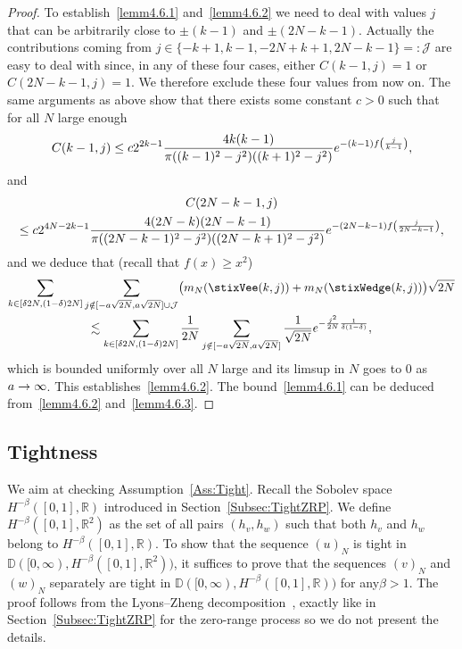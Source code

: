 \documentclass[AHL,Unicode,longabstracts]{cedram}
\newcommand{\Wedge}{\stixWedge}
\newcommand{\Vee}{\stixVee}
\theoremstyle{plain}
\newcommand{\bbD}{\mathbb{D}}
\newcommand{\cJ}{\mathcal{J}}
\newcommand{\R}{\mathbb{R}}
\let\originalleft\left
\let\originalright\right
\renewcommand{\left}{\mathopen{}\mathclose\bgroup\originalleft}
\renewcommand{\right}{\aftergroup\egroup\originalright}
\renewcommand*{\to}{\mathchoice{\longrightarrow}{\rightarrow}{\rightarrow}{\rightarrow}}
\begin{document}
\begin{proof}
To establish~\eqref{lemm4.6.1} and~\eqref{lemm4.6.2} we need to deal with values $j$ that can be arbitrarily close to $\pm (k-1)$ and $\pm (2N-k-1)$. Actually the contributions coming from $j\in \{-k+1,k-1,-2N+k+1,2N-k-1\}=:\cJ$ are easy to deal with since, in any of these four cases, either $C(k-1,j)=1$ or $C(2N-k-1,j)=1$. We therefore exclude these four values from now on. The same arguments as above show that there exists some constant $c>0$ such that for all $N$ large enough
\[
C(k-1,j) \le c 2^{2k-1} \frac{4k(k-1)}{\pi ((k-1)^2-j^2)((k+1)^2-j^2)} e^{-(k-1) f\left(\frac{j}{k-1}\right)},
\]
and
\begin{multline*}
C(2N-k-1,j) \\
\le c 2^{4N-2k-1} \frac{4(2N-k)(2N-k-1)}{\pi ((2N-k-1)^2-j^2)((2N-k+1)^2-j^2)} e^{-(2N-k-1) f\left(\frac{j}{2N-k-1}\right)},
\end{multline*}
and we deduce that (recall that $f(x) \ge x^2$)
\begin{multline*}
\sum_{k\in [\delta 2N, (1 - \delta) 2N]} \sum_{j\notin [-a\sqrt{2N}, a\sqrt{2N}]\cup \cJ}\bigl(m_N(\Vee(k,j)) + m_N(\Wedge(k,j))\bigr)\sqrt{2N}\\
\lesssim
\sum_{k\in [\delta 2N, (1 - \delta) 2N]} \frac1{2N}\sum_{j\notin [-a\sqrt{2N}, a\sqrt{2N}]}\frac1{\sqrt{2N}} e^{-\frac{j^2}{2N} \frac{1}{\delta(1-\delta)}},
\end{multline*}
which is bounded uniformly over all $N$ large and its limsup in $N$ goes to $0$ as $a\to\infty$. This establishes~\eqref{lemm4.6.2}. The bound~\eqref{lemm4.6.1} can be deduced from~\eqref{lemm4.6.2} and~\eqref{lemm4.6.3}.
\end{proof}

\subsection{Tightness}

We aim at checking Assumption~\ref{Ass:Tight}. Recall the Sobolev space $H^{-\beta}([0,1],\R)$ introduced in Section~\ref{Subsec:TightZRP}. We define $H^{-\beta}([0,1],\R^2)$ as the set of all pairs $(h_v,h_w)$ such that both $h_v$ and $h_w$ belong to $H^{-\beta}([0,1],\R)$. To show that the sequence $(u)_N$ is tight in $\bbD([0,\infty),H^{-\beta}([0,1],\R^2))$, it suffices to prove that the sequences $(v)_N$ and $(w)_N$ separately are tight in $\bbD([0,\infty),H^{-\beta}([0,1],\R))$ for any$\beta > 1$. The proof follows from the Lyons--Zheng decomposition~\cite{LyonsZheng}, exactly like in Section~\ref{Subsec:TightZRP} for the {zero-range process} so we do not present the details.
\end{document}
